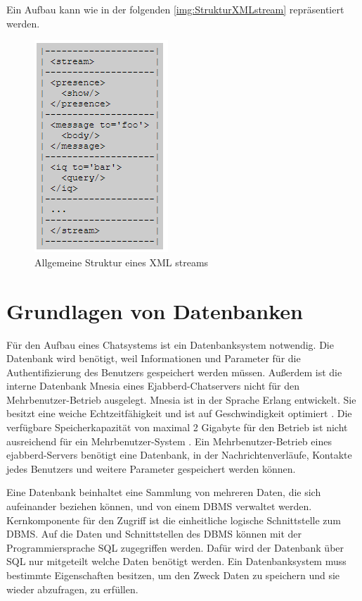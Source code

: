 \documentclass[a4paper,titlepage,halfparskip,12pt]{scrreprt}
\begin{document}
\begin{onehalfspacing}
\pagebreak

Ein Aufbau kann wie in der folgenden \autoref{img:StrukturXMLstream} repräsentiert werden. \cite{RFC6120Sec4}
\begin{figure}[h]
	\centering
	\includegraphics[scale=1.2]{images/XML_Stream}
	\caption{Allgemeine Struktur eines XML streams}
	\label{img:StrukturXMLstream}
\end{figure}

\pagebreak

\section{Grundlagen von Datenbanken}
\label{sec:Datenbank}
Für den Aufbau eines Chatsystems ist ein Datenbanksystem notwendig. Die Datenbank wird benötigt, weil Informationen und Parameter für die Authentifizierung des Benutzers gespeichert werden müssen. Außerdem ist die interne Datenbank Mnesia eines Ejabberd-Chatservers nicht für den Mehrbenutzer-Betrieb ausgelegt. Mnesia ist in der Sprache Erlang entwickelt. Sie besitzt eine weiche Echtzeitfähigkeit und ist auf Geschwindigkeit optimiert \cite{MnesiaDoc}. Die verfügbare Speicherkapazität von maximal 2 Gigabyte für den Betrieb ist nicht ausreichend für ein Mehrbenutzer-System \cite{ejabberdDoc}. Ein Mehrbenutzer-Betrieb eines ejabberd-Servers benötigt eine Datenbank, in der Nachrichtenverläufe, Kontakte jedes Benutzers und weitere Parameter gespeichert werden können.

Eine Datenbank beinhaltet eine Sammlung von mehreren Daten, die sich aufeinander beziehen können, und von einem \ac{DBMS} verwaltet werden. Kernkomponente für den Zugriff ist die einheitliche logische Schnittstelle zum \ac{DBMS}. Auf die Daten und Schnittstellen des \acs{DBMS} können mit der Programmiersprache \ac{SQL} zugegriffen werden. Dafür wird der Datenbank über \ac{SQL} nur mitgeteilt welche Daten benötigt werden. Ein Datenbanksystem muss bestimmte Eigenschaften besitzen, um den Zweck Daten zu speichern und sie wieder abzufragen, zu erfüllen.


\end{onehalfspacing}
\end{document}
